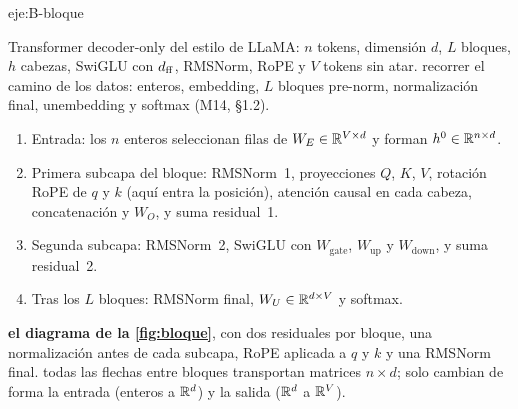\begin{solucion}{eje:B-bloque}

\datos Transformer decoder-only del estilo de LLaMA: $n$ tokens, dimensión $d$, $L$ bloques, $h$ cabezas, SwiGLU con $d_{\mathrm{ff}}$, RMSNorm, RoPE y $V$ tokens sin atar.
\planteamiento recorrer el camino de los datos: enteros, embedding, $L$ bloques pre-norm, normalización final, unembedding y softmax (M14, §1.2).
\pasos
\begin{enumerate}[label=\arabic*.]
  \item Entrada: los $n$ enteros seleccionan filas de $W_E\in\mathbb{R}^{V\times d}$ y forman $h^{0}\in\mathbb{R}^{n\times d}$.
  \item Primera subcapa del bloque: RMSNorm~1, proyecciones $Q$, $K$, $V$, rotación RoPE de $q$ y $k$ (aquí entra la posición), atención causal en cada cabeza, concatenación y $W_O$, y suma residual~1.
  \item Segunda subcapa: RMSNorm~2, SwiGLU con $W_{\mathrm{gate}}$, $W_{\mathrm{up}}$ y $W_{\mathrm{down}}$, y suma residual~2.
  \item Tras los $L$ bloques: RMSNorm final, $W_U\in\mathbb{R}^{d\times V}$ y softmax.
\end{enumerate}
\resultado \textbf{el diagrama de la \cref{fig:bloque}}, con dos residuales por bloque, una normalización antes de cada subcapa, RoPE aplicada a $q$ y $k$ y una RMSNorm final.
\comprobacion todas las flechas entre bloques transportan matrices $n\times d$; solo cambian de forma la entrada (enteros a $\mathbb{R}^{d}$) y la salida ($\mathbb{R}^{d}$ a $\mathbb{R}^{V}$).


\end{solucion}
